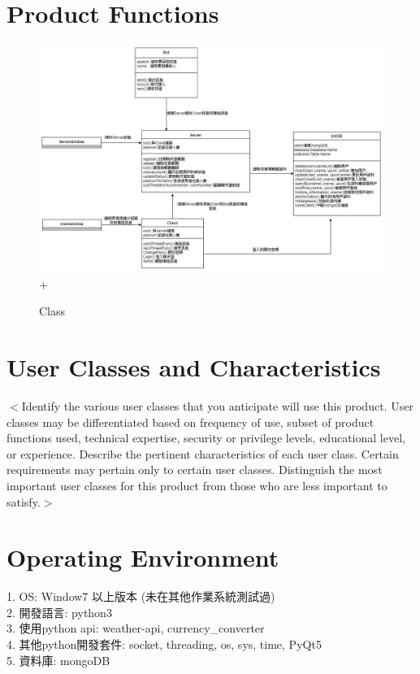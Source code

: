 \documentclass{scrreprt}
\begin{document}
\begin{CJK}{UTF8}{bkai}
\section{Product Functions}
\begin{figure}[h]
\begin{center}
\includegraphics[width=14cm]{Class.jpg}
+\end{center}
\caption{Class}
\label{fig:1}
\end{figure}

\section{User Classes and Characteristics}
$<$Identify the various user classes that you anticipate will use this product.  
User classes may be differentiated based on frequency of use, subset of product 
functions used, technical expertise, security or privilege levels, educational 
level, or experience. Describe the pertinent characteristics of each user class.  
Certain requirements may pertain only to certain user classes. Distinguish the 
most important user classes for this product from those who are less important 
to satisfy.$>$

\section{Operating Environment}
1. OS: Window7 以上版本 (未在其他作業系統測試過) \\
2. 開發語言: python3 \\
3. 使用python api: weather-api, currency_converter \\
4. 其他python開發套件: socket, threading, os, sys, time, PyQt5 \\
5. 資料庫: mongoDB


\end{CJK}
\end{document}
